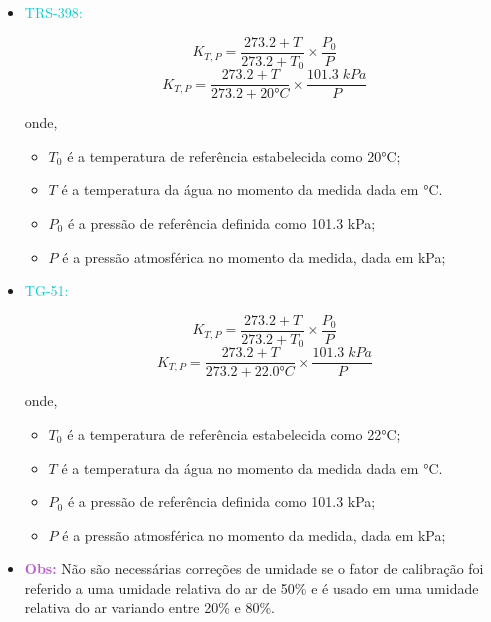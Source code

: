 \documentclass[11pt,a4paper]{article}
\newcounter{exemplo}
\begin{document}
	\begin{exemplo}
		\begin{itemize}
			\item \textcolor{DarkTurquoise}{TRS-398:}

				$$K_{T,P} = \frac{273.2 + T}{273.2 + T_0} \times \frac{P_0}{P}$$
				$$K_{T,P} = \frac{273.2 + T}{273.2 + \ang{20}C} \times \frac{101.3\;kPa}{P}$$

			onde,
			\begin{itemize}[label=\textcolor{CarnationPink}{$\star$}]
				\item $T_0$ é a temperatura de referência estabelecida como \ang{20}C;
				\item $T$ é a temperatura da água no momento da medida dada em \unit{\celsius}.
				\item $P_0$ é a pressão de referência definida como 101.3 kPa;
				\item $P$ é a pressão atmosférica no momento da medida, dada em kPa;
			\end{itemize}

			\item \textcolor{DarkTurquoise}{TG-51:}
			
				$$K_{T,P} = \frac{273.2 + T}{273.2 + T_0} \times \frac{P_0}{P}$$
				$$K_{T,P} = \frac{273.2 + T}{273.2 + \ang{22.0}C} \times \frac{101.3\;kPa}{P}$$

			onde,
			\begin{itemize}[label=\textcolor{CarnationPink}{$\star$}]
				\item $T_0$ é a temperatura de referência estabelecida como \ang{22}C;
				\item $T$ é a temperatura da água no momento da medida dada em \unit{\celsius}.
				\item $P_0$ é a pressão de referência definida como 101.3 kPa;
				\item $P$ é a pressão atmosférica no momento da medida, dada em kPa;
			\end{itemize}
			\item \textcolor{MediumOrchid}{\textbf{Obs:}} Não são necessárias correções de umidade se o fator de calibração foi referido a uma umidade relativa do ar de 50\% e é usado em uma umidade relativa  do ar variando entre 20\% e 80\%.
		\end{itemize}
	\end{exemplo}
\end{document}

